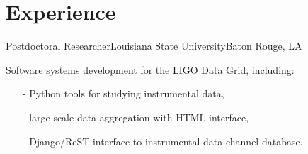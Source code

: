 \section{Experience}

%
    {Postdoctoral Researcher}{Louisiana State University}{Baton Rouge, LA}{}%
    {Software systems development for the LIGO Data Grid, including:
     \begin{itemize}
         \setlength{\itemindent}{1cm}
         \item[-] Python tools for studying instrumental data,
         \item[-] large-scale data aggregation with HTML interface,
         \item[-] Django/ReST interface to instrumental data channel database.
     \end{itemize}
    }
